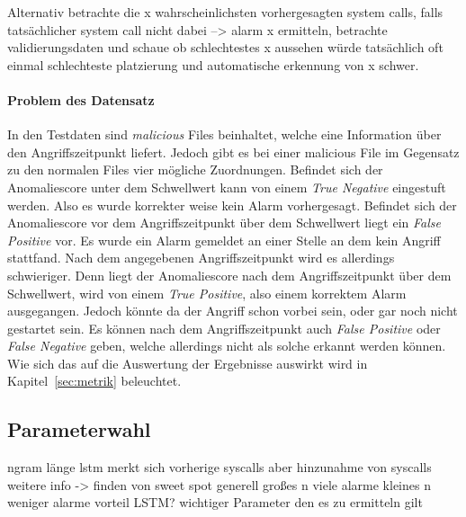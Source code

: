             Alternativ betrachte die x wahrscheinlichsten vorhergesagten system calls, falls tatsächlicher system call nicht dabei --> alarm
            x ermitteln, betrachte validierungsdaten und schaue ob schlechtestes x aussehen würde
            tatsächlich oft einmal schlechteste platzierung und automatische erkennung von x schwer.

            \paragraph{Problem des Datensatz}

                In den Testdaten sind \textit{malicious}  Files beinhaltet, welche eine Information über den Angriffszeitpunkt liefert. 
                Jedoch gibt es bei einer malicious File im Gegensatz zu den normalen Files  vier mögliche Zuordnungen.
                Befindet sich der Anomaliescore unter dem Schwellwert kann von einem \textit{True Negative} eingestuft werden.
                Also es wurde korrekter weise kein Alarm vorhergesagt.
                Befindet sich der Anomaliescore vor dem Angriffszeitpunkt über dem Schwellwert liegt ein \textit{False Positive} vor.
                Es wurde ein Alarm gemeldet an einer Stelle an dem kein Angriff stattfand.
                Nach dem angegebenen Angriffszeitpunkt wird es allerdings schwieriger.
                Denn liegt der Anomaliescore nach dem Angriffszeitpunkt über dem Schwellwert, wird von einem \textit{True Positive}, also einem korrektem Alarm ausgegangen.
                Jedoch könnte da der Angriff schon vorbei sein, oder gar noch nicht gestartet sein.
                Es können nach dem Angriffszeitpunkt auch \textit{False Positive} oder \textit{False Negative} geben, welche allerdings nicht als solche erkannt werden können.
                Wie sich das auf die Auswertung der Ergebnisse auswirkt wird in Kapitel~\ref{sec:metrik} beleuchtet.

        \subsection{Parameterwahl}
            ngram länge
            lstm merkt sich vorherige syscalls aber hinzunahme von syscalls weitere info
            -> finden von sweet spot
            generell großes n viele alarme
            kleines n weniger alarme  vorteil LSTM\@?
            wichtiger Parameter den es zu ermitteln gilt

